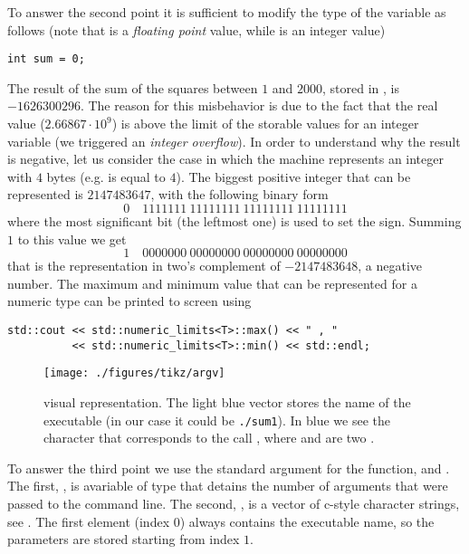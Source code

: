 To answer the second point it is sufficient to modify the type of the variable
 as follows (note that  is a \emph{floating point} value, while
 is an integer value)
\begin{lstlisting}
int sum = 0;
\end{lstlisting}
The result of the sum of the squares between $1$ and $2000$, stored in
, is $-1626300296$. The reason for this misbehavior is due to the fact
that the real value ($2.66867\cdot 10^9$) is above the limit of the storable
values for an integer variable (we triggered an \emph{integer overflow}). In
order to understand why the result is negative, let us consider the case in
which the machine represents an integer with $4$ bytes (e.g. is
equal to $4$). The biggest positive integer that can be represented is
$2147483647$, with the following binary form
\begin{equation*}
0\quad 1111111~11111111~11111111~11111111
\end{equation*}
where the most significant bit (the leftmost one) is used to set the sign.
Summing $1$ to this value we get
\begin{equation*}
1\quad 0000000~00000000~00000000~00000000
\end{equation*}
that is the representation in two's complement of $-2147483648$, a negative
number. The maximum and minimum value that can be represented for a numeric
type  can be printed to screen using
\begin{lstlisting}
std::cout << std::numeric_limits<T>::max() << " , "
          << std::numeric_limits<T>::min() << std::endl;
\end{lstlisting}
%
\begin{figure}
\centering
\texttt{[image: ./figures/tikz/argv]}
\caption{ visual representation. The light blue vector stores the
  name of the executable (in our case it could be \texttt{./sum1}). In blue
  we see the character that corresponds to the call , where
   and  are two .}
\label{fig:argv}
\end{figure}
To answer the third point we use the standard argument for the 
function,  and . The first, , is  avariable of
type  that detains the number of arguments that were passed to the
command line. The second, , is a vector of c-style character strings,
see . The first  element (index $0$) always contains
the executable name, so the parameters are stored starting from index $1$.
